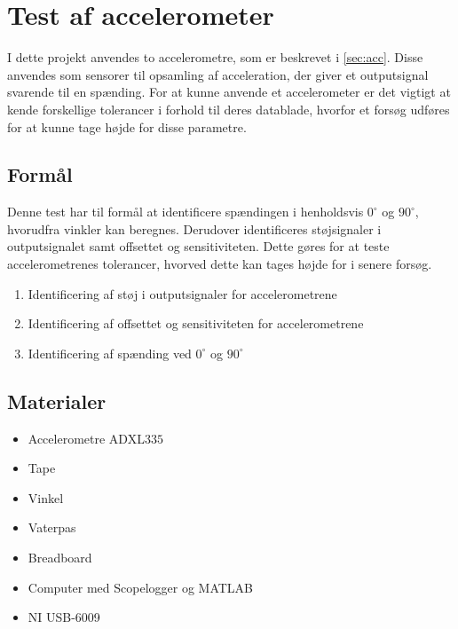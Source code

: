 \section{Test af accelerometer} 
\label{sec:test_acc}
I dette projekt anvendes to accelerometre, som er beskrevet i \autoref{sec:acc}. Disse anvendes som sensorer til opsamling af acceleration, der giver et outputsignal svarende til en spænding. For at kunne anvende et accelerometer er det vigtigt at kende forskellige tolerancer i forhold til deres datablade, hvorfor et forsøg udføres for at kunne tage højde for disse parametre.

\subsection{Formål}
Denne test har til formål at identificere spændingen i henholdsvis $0^{\circ}$ og $90^{\circ}$, hvorudfra vinkler kan beregnes. Derudover identificeres støjsignaler i outputsignalet samt offsettet og sensitiviteten. Dette gøres for at teste accelerometrenes tolerancer, hvorved dette kan tages højde for i senere forsøg. 

\begin{enumerate}
\item Identificering af støj i outputsignaler for accelerometrene
\item Identificering af offsettet og sensitiviteten for accelerometrene
\item Identificering af spænding ved $0^{\circ}$ og $90^{\circ}$
\end{enumerate}

\subsection{Materialer}
\begin{itemize}
\item Accelerometre ADXL$335$
\item Tape
\item Vinkel
\item Vaterpas
\item Breadboard
\item Computer med Scopelogger og MATLAB
\item NI USB-6009
\end{itemize}

